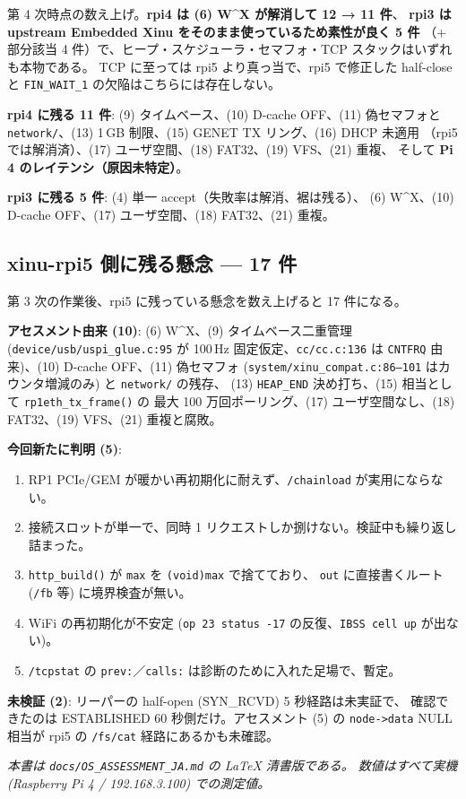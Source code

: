 \documentclass[a4paper,11pt]{ltjsarticle}
\begin{document}
第 4 次時点の数え上げ。\textbf{rpi4 は (6) W\textasciicircum X が解消して 12 → 11 件}、
\textbf{rpi3 は upstream Embedded Xinu をそのまま使っているため素性が良く 5 件}
（+ 部分該当 4 件）で、ヒープ・スケジューラ・セマフォ・TCP スタックはいずれも本物である。
TCP に至っては rpi5 より真っ当で、rpi5 で修正した half-close と
\texttt{FIN\_WAIT\_1} の欠陥はこちらには存在しない。

\textbf{rpi4 に残る 11 件}: (9) タイムベース、(10) D-cache OFF、(11) 偽セマフォと
\texttt{network/}、(13) 1\,GB 制限、(15) GENET TX リング、(16) DHCP 未適用
（rpi5 では解消済）、(17) ユーザ空間、(18) FAT32、(19) VFS、(21) 重複、
そして \textbf{Pi 4 のレイテンシ（原因未特定）}。

\textbf{rpi3 に残る 5 件}: (4) 単一 accept（失敗率は解消、裾は残る）、
(6) W\textasciicircum X、(10) D-cache OFF、(17) ユーザ空間、(18) FAT32、(21) 重複。

\subsection{xinu-rpi5 側に残る懸念 --- 17 件}

第 3 次の作業後、rpi5 に残っている懸念を数え上げると 17 件になる。

\textbf{アセスメント由来 (10)}: (6) W\textasciicircum X、(9) タイムベース二重管理
(\texttt{device/usb/uspi\_glue.c:95} が 100\,Hz 固定仮定、\texttt{cc/cc.c:136} は
\texttt{CNTFRQ} 由来)、(10) D-cache OFF、(11) 偽セマフォ
(\texttt{system/xinu\_compat.c:86--101} はカウンタ増減のみ) と \texttt{network/} の残存、
(13) \texttt{HEAP\_END} 決め打ち、(15) 相当として \texttt{rp1eth\_tx\_frame()} の
最大 100 万回ポーリング、(17) ユーザ空間なし、(18) FAT32、(19) VFS、(21) 重複と腐敗。

\textbf{今回新たに判明 (5)}:
\begin{enumerate}[leftmargin=1.6em,itemsep=2pt]
\item RP1 PCIe/GEM が暖かい再初期化に耐えず、\texttt{/chainload} が実用にならない。
\item 接続スロットが単一で、同時 1 リクエストしか捌けない。検証中も繰り返し詰まった。
\item \texttt{http\_build()} が \texttt{max} を \texttt{(void)max} で捨てており、
      \texttt{out} に直接書くルート (\texttt{/fb} 等) に境界検査が無い。
\item WiFi の再初期化が不安定 (\texttt{op 23 status -17} の反復、\texttt{IBSS cell up} が出ない)。
\item \texttt{/tcpstat} の \texttt{prev:}／\texttt{calls:} は診断のために入れた足場で、暫定。
\end{enumerate}

\textbf{未検証 (2)}: リーパーの half-open (SYN\_RCVD) 5 秒経路は未実証で、
確認できたのは ESTABLISHED 60 秒側だけ。アセスメント (5) の \texttt{node->data} NULL 相当が
rpi5 の \texttt{/fs/cat} 経路にあるかも未確認。

\vfill
{\small\itshape 本書は \texttt{docs/OS\_ASSESSMENT\_JA.md} の LaTeX 清書版である。
数値はすべて実機 (Raspberry Pi 4 / 192.168.3.100) での測定値。}
\end{document}
